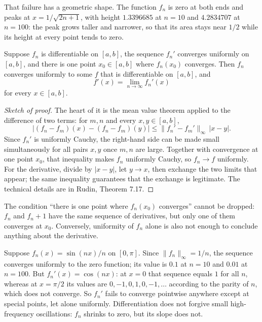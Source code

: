 That failure has a geometric shape. The function $f_n$ is zero at both ends
and peaks at $x=1/\sqrt{2n+1}$, with height $1.3396685$ at $n=10$ and
$4.2834707$ at $n=100$: the peak grows taller and narrower, so that its
area stays near $1/2$ while its height at every point tends to zero.

\begin{teorema}
Suppose $f_n$ is differentiable on $[a,b]$, the sequence $f_n'$ converges uniformly
on $[a,b]$, and there is one point $x_0\in[a,b]$ where $f_n(x_0)$ converges.
Then $f_n$ converges uniformly to some $f$ that is differentiable on $[a,b]$,
and
\[
  f'(x)=\lim_{n\to\infty}f_n'(x)
\]
for every $x\in[a,b]$.
\end{teorema}

\begin{proof}[Sketch of proof]
The heart of it is the mean value theorem applied to the difference of two terms: for $m,n$ and every
$x,y\in[a,b]$,
\[
  \bigl|(f_n-f_m)(x)-(f_n-f_m)(y)\bigr|\le\|f_n'-f_m'\|_\infty\,|x-y| .
\]
Since $f_n'$ is uniformly Cauchy, the right-hand side can be made small simultaneously for all
pairs $x,y$ once $m,n$ are large. Together with convergence at one point $x_0$,
that inequality makes $f_n$ uniformly Cauchy, so $f_n\to f$ uniformly. For the
derivative, divide by $|x-y|$, let $y\to x$, then exchange the two limits that
appear; the same inequality guarantees that the exchange is legitimate. The technical details are in
Rudin, Theorem 7.17.
\end{proof}

The condition ``there is one point where $f_n(x_0)$ converges'' cannot be dropped: $f_n$
and $f_n+1$ have the same sequence of derivatives, but only one of them
converges at $x_0$. Conversely, uniformity of $f_n$ alone is also not enough to
conclude anything about the derivative.

\begin{contoh}
Suppose $f_n(x)=\sin(nx)/n$ on $[0,\pi]$. Since $\|f_n\|_\infty=1/n$,
the sequence converges uniformly to the zero function; its value is $0.1$ at $n=10$ and
$0.01$ at $n=100$. But $f_n'(x)=\cos(nx)$: at $x=0$ that sequence equals
$1$ for all $n$, whereas at $x=\pi/2$ its values are $0,-1,0,1,0,-1,\ldots$
according to the parity of $n$, which does not converge. So $f_n'$ fails to converge pointwise
anywhere except at special points, let alone uniformly. Differentiation
does not forgive small high-frequency oscillations: $f_n$ shrinks to zero,
but its slope does not.
\end{contoh}

